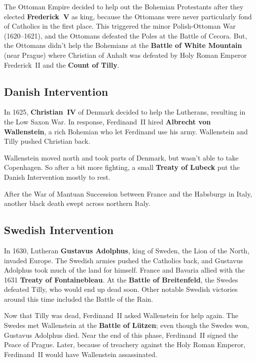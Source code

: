 The Ottoman Empire decided to help out the Bohemian Protestants
after they elected \textbf{Frederick~V} as king,
because the Ottomans were never particularly fond of Catholics in the first place.
This triggered the minor Polish-Ottoman War (1620--1621),
and the Ottomans defeated the Poles at the Battle of Cecora.
But, the Ottomans didn't help the Bohemians at the \textbf{Battle of White Mountain} (near Prague)
where Christian of Anhalt
was defeated by Holy Roman Emperor Frederick~II and the \textbf{Count of Tilly}.

\subsection*{Danish Intervention}

In 1625, \textbf{Christian~IV} of Denmark decided to help the Lutherans,
resulting in the Low Saxon War.
In response, Ferdinand~II hired \textbf{Albrecht von Wallenstein},
a rich Bohemian who let Ferdinand use his army.
Wallenstein and Tilly pushed Christian back.

Wallenstein moved north and took parts of Denmark, but wasn't able to take Copenhagen.
So after a bit more fighting,
a small \textbf{Treaty of Lubeck} put the Danish Intervention mostly to rest.

After the War of Mantuan Succession between France and the Habsburgs in Italy,
another black death swept across northern Italy.

\subsection*{Swedish Intervention}

In 1630, Lutheran \textbf{Gustavus Adolphus}, king of Sweden, the Lion of the North, invaded Europe.
The Swedish armies pushed the Catholics back,
and Gustavus Adolphus took much of the land for himself.
France and Bavaria allied with the 1631 \textbf{Treaty of Fontainebleau}.
At the \textbf{Battle of Breitenfeld}, the Swedes defeated Tilly, who would end up dead soon.
Other notable Swedish victories around this time included the Battle of the Rain.

Now that Tilly was dead, Ferdinand~II asked Wallenstein for help again.
The Swedes met Wallenstein at the \textbf{Battle of L\"utzen};
even though the Swedes won, Gustavus Adolphus died.
Near the end of this phase, Ferdinand~II signed the Peace of Prague.
Later, because of treachery against the Holy Roman Emperor,
Ferdinand~II would have Wallenstein assassinated.

